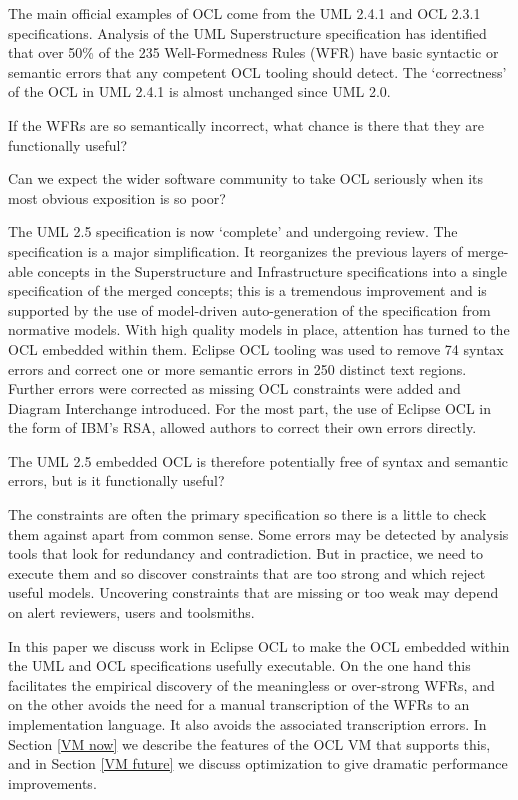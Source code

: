 \documentclass{sig-alternate}
\begin{document}
The main official examples of OCL come from the UML 2.4.1\cite{UML-2.4.1-Super} and OCL 2.3.1\cite{OCL-2.3.1} specifications. Analysis\cite{UML-inconsistent} of the UML Superstructure specification has identified that over 50\% of the 235 Well-Formedness Rules (WFR) have basic syntactic or semantic errors
that any competent OCL tooling should detect. The `correctness' of the OCL in UML 2.4.1 is almost unchanged
since UML 2.0.

If the WFRs are so semantically incorrect, what chance is there that they are functionally useful?

Can we expect the wider software community to take OCL seriously when its most obvious exposition is so poor?

The UML 2.5 specification is now `complete' and undergoing review. The specification is a major simplification. It
reorganizes the previous layers of merge-able concepts in the Superstructure and Infrastructure specifications into
a single specification of the merged concepts; this is a tremendous improvement and is supported by the use of
model-driven auto-generation of the specification from normative models. With high quality models in place, attention has
turned to the OCL embedded within them. Eclipse OCL\cite{MDT/OCL} tooling was used to remove 74 syntax errors and correct one or more semantic errors in 250 distinct text regions. Further errors were corrected as missing OCL constraints were added and Diagram Interchange introduced.
For the most part, the use of Eclipse OCL in the form of IBM's RSA, allowed authors to correct their own errors directly.

The UML 2.5 embedded OCL is therefore potentially free of syntax and semantic errors, but is it functionally useful?

The constraints are often the primary specification so there is a little to check them against apart from common sense.
Some errors may be detected by analysis tools that look for redundancy and contradiction. But in practice, we need to
execute them and so discover constraints that are too strong and which reject useful models. Uncovering constraints
that are missing or too weak may depend on alert reviewers, users and toolsmiths.

In this paper we discuss work in Eclipse OCL to make the OCL embedded within the UML and OCL specifications usefully
executable. On the one hand this facilitates the empirical discovery of the meaningless or over-strong WFRs, and on the other avoids the need for a manual transcription of the WFRs to an implementation language. It also avoids the associated transcription errors. In Section \ref{VM now} we describe the features of the OCL VM that supports this, and in Section \ref{VM future} we discuss optimization to give dramatic performance improvements. 
\end{document}
